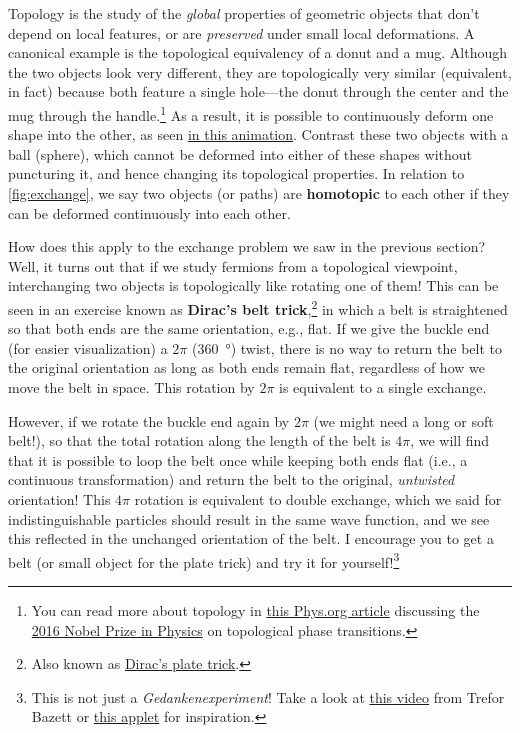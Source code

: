 \documentclass[12pt, english]{book}
\begin{document}
Topology is the study of the \emph{global} properties of geometric objects that don't depend on local features, or are \emph{preserved} under small local deformations.
A canonical example is the topological equivalency of a donut and a mug.
Although the two objects look very different, they are topologically very similar (equivalent, in fact) because both feature a single hole---the donut through the center and the mug through the handle.\footnote{You can read more about topology in \href{https://phys.org/news/2016-10-coffee-donut-topology.html}{this Phys.org article} discussing the \href{https://www.nobelprize.org/prizes/physics/2016/summary/}{2016 Nobel Prize in Physics} on topological phase transitions.}
As a result, it is possible to continuously deform one shape into the other, as seen \href{https://tex.stackexchange.com/questions/210255/torus-to-coffee-mug-homotopy}{in this animation}.
Contrast these two objects with a ball (sphere), which cannot be deformed into either of these shapes without puncturing it, and hence changing its topological properties.
In relation to \autoref{fig:exchange}, we say two objects (or paths) are \textbf{homotopic} to each other if they can be deformed continuously into each other.

How does this apply to the exchange problem we saw in the previous section?
Well, it turns out that if we study fermions from a topological viewpoint, interchanging two objects is topologically like rotating one of them!
This can be seen in an exercise known as \textbf{Dirac's belt trick},\footnote{Also known as \href{https://en.wikipedia.org/wiki/Plate_trick}{Dirac's plate trick}.} in which a belt is straightened so that both ends are the same orientation, e.g., flat.
If we give the buckle end (for easier visualization) a $2\pi$ (\SI{360}{\degree}) twist, there is no way to return the belt to the original orientation as long as both ends remain flat, regardless of how we move the belt in space.
This rotation by $2\pi$ is equivalent to a single exchange.

However, if we rotate the buckle end again by $2\pi$ (we might need a long or soft belt!), so that the total rotation along the length of the belt is $4\pi$, we will find that it is possible to loop the belt once while keeping both ends flat (i.e., a continuous transformation) and return the belt to the original, \emph{untwisted} orientation!
This $4\pi$ rotation is equivalent to double exchange, which we said for indistinguishable particles should result in the same wave function, and we see this reflected in the unchanged orientation of the belt.
I encourage you to get a belt (or small object for the plate trick) and try it for yourself!\footnote{This is not just a \emph{Gedankenexperiment}! Take a look at \href{https://www.youtube.com/watch?v=EgsUDby0X1M}{this video} from Trefor Bazett or \href{https://www.gregegan.net/APPLETS/21/21.html}{this applet} for inspiration.}
\end{document}
